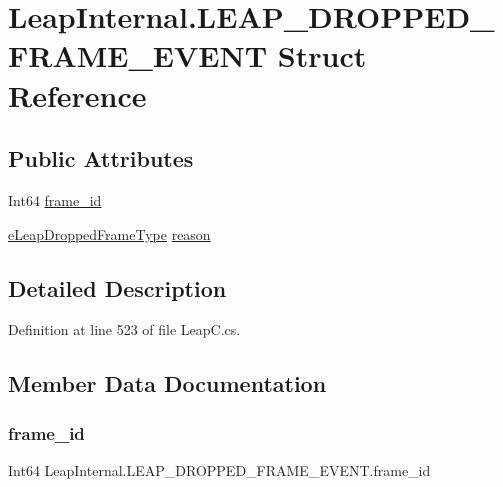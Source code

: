 \hypertarget{struct_leap_internal_1_1_l_e_a_p___d_r_o_p_p_e_d___f_r_a_m_e___e_v_e_n_t}{}\section{Leap\+Internal.\+L\+E\+A\+P\+\_\+\+D\+R\+O\+P\+P\+E\+D\+\_\+\+F\+R\+A\+M\+E\+\_\+\+E\+V\+E\+NT Struct Reference}
\label{struct_leap_internal_1_1_l_e_a_p___d_r_o_p_p_e_d___f_r_a_m_e___e_v_e_n_t}
\subsection*{Public Attributes}
\begin{DoxyCompactItemize}
\item 
Int64 \mbox{\hyperlink{struct_leap_internal_1_1_l_e_a_p___d_r_o_p_p_e_d___f_r_a_m_e___e_v_e_n_t_a0a4e75f2377113de463b8aae2062a375}{frame\+\_\+id}}
\item 
\mbox{\hyperlink{namespace_leap_internal_af32f98bc0f7257d572aa3f3c3dac43a3}{e\+Leap\+Dropped\+Frame\+Type}} \mbox{\hyperlink{struct_leap_internal_1_1_l_e_a_p___d_r_o_p_p_e_d___f_r_a_m_e___e_v_e_n_t_ad2167f447f84732befdb08cc5f0d8b78}{reason}}
\end{DoxyCompactItemize}


\subsection{Detailed Description}


Definition at line 523 of file Leap\+C.\+cs.



\subsection{Member Data Documentation}
\mbox{\label{struct_leap_internal_1_1_l_e_a_p___d_r_o_p_p_e_d___f_r_a_m_e___e_v_e_n_t_a0a4e75f2377113de463b8aae2062a375}} 
\subsubsection{\texorpdfstring{frame\_id}{frame\_id}}
{\footnotesize\ttfamily Int64 Leap\+Internal.\+L\+E\+A\+P\+\_\+\+D\+R\+O\+P\+P\+E\+D\+\_\+\+F\+R\+A\+M\+E\+\_\+\+E\+V\+E\+N\+T.\+frame\+\_\+id}



